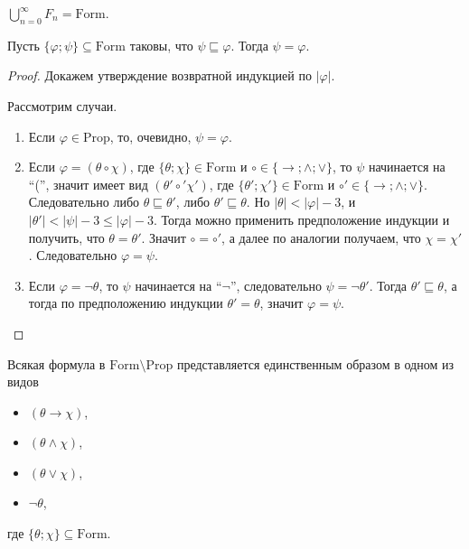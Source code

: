 \documentclass[12pt,a4paper]{article}
\newcommand{\Prop}{\ensuremath{\mathrm{Prop}}\xspace}
\newcommand{\Formul}{\ensuremath{\mathrm{Form}}\xspace}
\begin{document}
    \begin{corollary}
        $\bigcup_{n=0}^\infty F_n = \Formul$. 
    \end{corollary}

    \begin{lemma}
        Пусть $\{\varphi; \psi\} \subseteq \Formul$ таковы, что $\psi \sqsubseteq \varphi$. Тогда $\psi = \varphi$.
    \end{lemma}

    \begin{proof}
        Докажем утверждение возвратной индукцией по $|\varphi|$.
        
        Рассмотрим случаи.
        \begin{enumerate}
            \item Если $\varphi \in \Prop$, то, очевидно, $\psi = \varphi$.
            \item Если $\varphi = (\theta \circ \chi)$, где $\{\theta; \chi\} \in \Formul$ и $\circ \in \{\rightarrow; \wedge; \vee\}$, то $\psi$ начинается на ``('', значит имеет вид $(\theta' \circ' \chi')$, где $\{\theta'; \chi'\} \in \Formul$ и $\circ' \in \{\rightarrow; \wedge; \vee\}$. Следовательно либо $\theta \sqsubseteq \theta'$, либо $\theta' \sqsubseteq \theta$. Но $|\theta| < |\varphi| - 3$, и $|\theta'| < |\psi| - 3 \leqslant |\varphi| - 3$. Тогда можно применить предположение индукции и получить, что $\theta = \theta'$. Значит $\circ = \circ'$, а далее по аналогии получаем, что $\chi = \chi'$. Следовательно $\varphi = \psi$.
            \item Если $\varphi = \neg \theta$, то $\psi$ начинается на ``$\neg$'', следовательно $\psi = \neg \theta'$. Тогда $\theta' \sqsubseteq \theta$, а тогда по предположению индукции $\theta' = \theta$, значит $\varphi = \psi$.
        \end{enumerate}
    \end{proof}

    \begin{theorem}
        Всякая формула в $\Formul \setminus \Prop$ представляется единственным образом в одном из видов
        \begin{itemize}
            \item $(\theta \rightarrow \chi)$,
            \item $(\theta \wedge \chi)$,
            \item $(\theta \vee \chi)$,
            \item $\neg \theta$,
        \end{itemize}
        где $\{\theta; \chi\} \subseteq \Formul$.
    \end{theorem}
\end{document}
